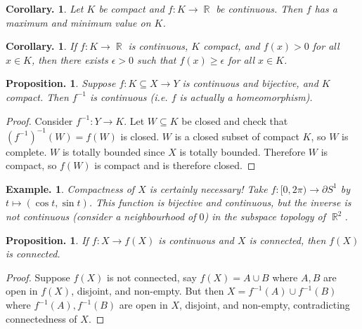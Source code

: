 \documentclass[11pt, a4paper]{memoir}
\DeclareMathOperator{\R}{{\mathbb{R}}}
\theoremstyle{change}
\newtheorem{corollary}[theorem]{Corollary.}
\newtheorem{proposition}[theorem]{Proposition.}
\theoremstyle{plain}
\theoremstyle{nonumberplain}
\newtheorem{example}{Example.}
\newtheorem{proof}{Proof}
\numberwithin{equation}{section}
\begin{document}
\begin{corollary}
    Let $K$ be compact and $f:K\to\R$ be continuous. Then $f$ has a maximum and minimum value on $K$.
\end{corollary}
\begin{corollary}
    If $f:K\to\R$ is continuous, $K$ compact, and $f(x)>0$ for all $x\in K$, then there exists $\epsilon>0$ such that
    $f(x)\geq\epsilon$ for all $x\in K$.
\end{corollary}
\begin{proposition}
    Suppose $f:K\subseteq X\to Y$ is continuous and bijective, and $K$ compact. Then $f^{-1}$ is continuous (i.e. $f$
    is actually a homeomorphism).
\end{proposition}
\begin{proof}
    Consider $f^{-1}:Y\to K$. Let $W\subseteq K$ be closed and check that $(f^{-1})^{-1}(W)=f(W)$ is closed. $W$ is a
    closed subset of compact $K$, so $W$ is complete. $W$ is totally bounded since $X$ is totally bounded. Therefore
    $W$ is compact, so $f(W)$ is compact and is therefore closed.
\end{proof}
\begin{example}
    Compactness of $X$ is certainly necessary! Take $f:[0,2\pi)\to\partial S^1$ by $t\mapsto(\cos t,\sin t)$. This function
    is bijective and continuous, but the inverse is not continuous (consider a neighbourhood of $0$) in the subspace
    topology of $\R^2$.
\end{example}
\begin{proposition}
    If $f:X\to f(X)$ is continuous and $X$ is connected, then $f(X)$ is connected.
\end{proposition}
\begin{proof}
    Suppose $f(X)$ is not connected, say $f(X)=A\cup B$ where $A,B$ are open in $f(X)$, disjoint, and non-empty. But
    then $X=f^{-1}(A)\cup f^{-1}(B)$ where $f^{-1}(A),f^{-1}(B)$ are open in $X$, disjoint, and non-empty, contradicting
    connectedness of $X$.
\end{proof}
\end{document}
